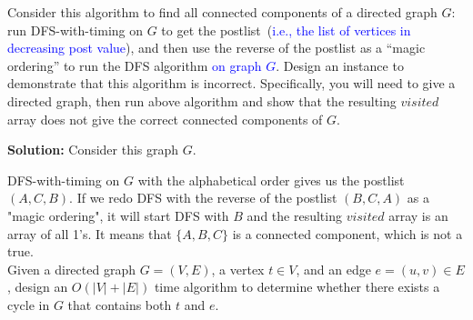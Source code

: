 \documentclass[11pt]{article}
\begin{document}
\maketitle



\begin{qunlist}

 Consider this algorithm to find all connected components of a directed
graph $G$: run DFS-with-timing on $G$ to get the postlist~(\textcolor{blue}{i.e., the list of vertices in decreasing post value}),
and then use the reverse of the postlist as a ``magic ordering'' to run the DFS algorithm \textcolor{blue}{on graph $G$}.
Design an instance to demonstrate that this algorithm is incorrect.
Specifically, you will need to give a directed graph, then run above algorithm
and show that the resulting $visited$ array does not give the correct connected
components of $G$.


\textbf{Solution: } Consider this graph $G$.\\

DFS-with-timing on $G$ with the alphabetical order gives us the postlist $(A, C, B)$. If we redo DFS with the reverse of the postlist $(B, C, A)$ as a "magic ordering", it will start DFS with $B$ and the resulting $visited$ array is an array of all 1's. It means that $\{A, B, C\}$ is a connected component, which is not a true. \\


Given a directed graph $G = (V, E)$, a vertex $t \in V$, and an edge $e = (u,v)\in E$, design
an $O(|V|+|E|)$ time algorithm to determine whether there exists a cycle in $G$ that contains both $t$ and $e$.


\end{qunlist}
\end{document}
